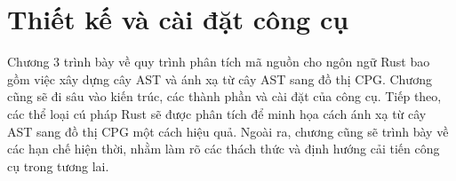 \chapter{Thiết kế và cài đặt công cụ}
\label{chap:method}

Chương 3 trình bày về quy trình phân tích mã nguồn cho ngôn ngữ Rust bao gồm việc xây dựng cây AST và ánh xạ từ cây AST sang đồ thị CPG.
Chương cũng sẽ đi sâu vào kiến trúc, các thành phần và cài đặt của công cụ.
Tiếp theo, các thể loại cú pháp Rust sẽ được phân tích để minh họa cách ánh xạ từ cây AST sang đồ thị CPG một cách hiệu quả.
Ngoài ra, chương cũng sẽ trình bày về các hạn chế hiện thời, nhằm làm rõ các thách thức và định hướng cải tiến công cụ trong tương lai.




% 


